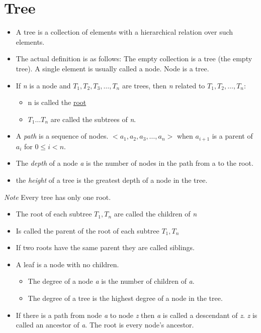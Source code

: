 \documentclass{article}
\begin{document}
\section{Tree}
\begin{itemize}
\item A tree is a collection of elements with a hierarchical relation over such elements.
\item The actual definition is as follows: The empty collection is a tree (the empty tree). A single element is usually called a node. Node is a tree.
\item If \textit{n} is a node and $T_1, T_2, T_3, \ldots , T_n$ are trees, then \textit{n} related to $T_1, T_2, \ldots, T_n$:
\begin{itemize}
    \item n is called the \underline{root}
    \item $T_1 \ldots T_n$ are called the subtrees of \textit{n}.
\end{itemize}
\item A \textit{path} is a sequence of nodes. $<a_1, a_2, a_3, \ldots, a_n>$ when $a_{i+1}$ is a parent of $a_i$ for $0 \leq i < n$.
\item The \textit{depth} of a node \textit{a} is the number of nodes in the path from a to the root.
\item the \textit{height} of a tree is the greatest depth of a node in the tree.
\end{itemize}

\textit{Note} Every tree has only one root.

\begin{itemize}
\item[Child] The root of each subtree $T_1, T_n$ are called the children of \textit{n}
\item[n] Is called the parent of the root of each subtree $T_1, T_n$
\item[Siblings] If two roots have the same parent they are called siblings.
\item[Leaf] A leaf is a node with no children.
\begin{itemize}
    \item[Degree] The degree of a node \textit{a} is the number of children of \textit{a}.
    \item The degree of a tree is the highest degree of a node in the tree.
\end{itemize}
\item[descendant/ancestor] If there is a path from node \textit{a} to node \textit{z} then \textit{a} is called a descendant of \textit{z}. \textit{z} is called an ancestor of \textit{a}. The root is every node's ancestor.
\end{itemize}
\end{document}
